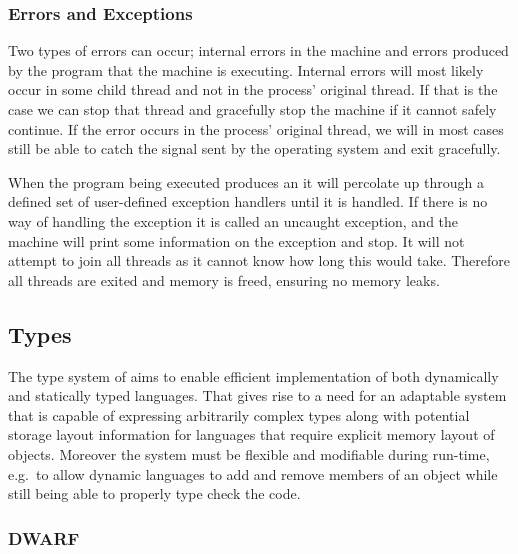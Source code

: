 \subsubsection{Errors and Exceptions}

Two types of errors can occur; internal errors in the machine and errors
produced by the program that the machine is executing. Internal errors will most
likely occur in some child thread and not in the process' original thread. If
that is the case we can stop that thread and gracefully stop the machine if it
cannot safely continue. If the error occurs in the process' original thread, we
will in most cases still be able to catch the signal sent by the operating
system and exit gracefully.

When the program being executed produces an  it will percolate
up through a defined set of user-defined exception handlers until it is
handled. If there is no way of handling the exception it is called an uncaught
exception, and the machine will print some information on the exception and
stop. It will not attempt to join all threads as it cannot know how long this
would take. Therefore all threads are exited and memory is freed, ensuring no
memory leaks.

\subsection{Types}
\label{sec:design:types}

The type system of \thename{} aims to enable efficient implementation of both
dynamically and statically typed languages. That gives rise to a need for an
adaptable system that is capable of expressing arbitrarily complex types along
with potential storage layout information for languages that require explicit
memory layout of objects. Moreover the system must be flexible and modifiable
during run-time, e.g.~to allow dynamic languages to add and remove members of an
object while still being able to properly type check the code.

\subsubsection{DWARF}
\label{sec:design:types:dwarf}

